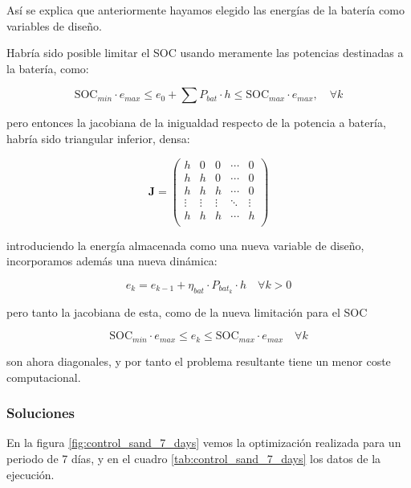 Así se explica que anteriormente hayamos elegido las energías de la batería como variables
de diseño.

Habría sido posible limitar el SOC usando meramente las potencias destinadas a
la batería, como:

\begin{equation}
	\text{SOC}_{min} \cdot e_{max} \leq e_0 + \sum P_{bat} \cdot h \leq \text{SOC}_{max} \cdot e_{max}, \quad \forall k
\end{equation}

pero entonces la jacobiana de la inigualdad respecto de la potencia a batería,
habría sido triangular inferior, densa:

\begin{equation}
	\mathbf{J} =
	\begin{pmatrix}
		h      & 0      & 0      & \cdots & 0      \\
		h      & h      & 0      & \cdots & 0      \\
		h      & h      & h      & \cdots & 0      \\
		\vdots & \vdots & \vdots & \ddots & \vdots \\
		h      & h      & h      & \cdots & h      \\
	\end{pmatrix}
\end{equation}

introduciendo la energía almacenada como una nueva variable de diseño, incorporamos
además una nueva dinámica:

\begin{equation}
	e_k = e_{k-1} + \eta_{bat} \cdot P_{bat_k} \cdot h \quad \forall k > 0
\end{equation}

pero tanto la jacobiana de esta, como de la nueva limitación para el SOC

\begin{equation}
	\text{SOC}_{min} \cdot e_{max} \leq e_k \leq \text{SOC}_{max} \cdot e_{max} \quad \forall k
\end{equation}

son ahora diagonales, y por tanto el problema resultante tiene un menor coste
computacional.

\subsubsection{Soluciones}

En la figura \ref{fig:control_sand_7_days} vemos la optimización realizada para
un periodo de 7 días, y en el cuadro \ref{tab:control_sand_7_days} los
datos de la ejecución.

